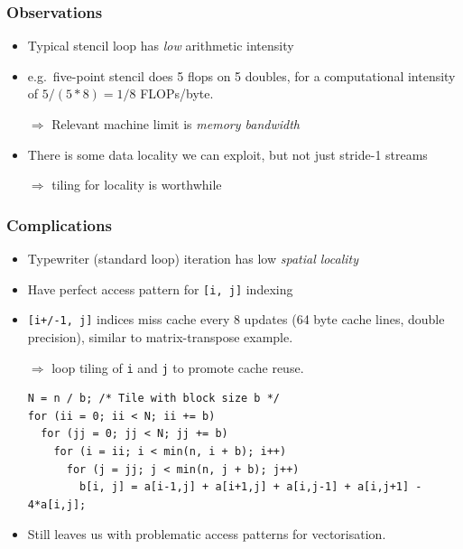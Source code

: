 \documentclass[presentation,aspectratio=43,10pt]{beamer}
\begin{document}
\begin{frame}
  \frametitle{Observations}
  \begin{itemize}
  \item Typical stencil loop has \emph{low} arithmetic intensity
  \item e.g.~five-point stencil does 5 flops on 5 doubles,
    for a computational intensity of $5 / (5*8) = 1/8$ FLOPs/byte.
  \item[$\Rightarrow$] Relevant machine limit is \emph{memory
      bandwidth}
  \item There is some data locality we can exploit, but not just
    stride-1 streams
  \item[$\Rightarrow$] tiling for locality is worthwhile
  \end{itemize}
\end{frame}

\begin{frame}[fragile]
  \frametitle{Complications}
  \begin{itemize}
  \item Typewriter (standard loop) iteration has low \emph{spatial
      locality}
  \item Have perfect access pattern for \texttt{[i, j]} indexing
  \item \texttt{[i+/-1, j]} indices miss cache every 8 updates (64
    byte cache lines, double precision), similar to matrix-transpose example.
  \item[$\Rightarrow$] loop tiling of \texttt{i} and \texttt{j} to
    promote cache reuse.
\begin{verbatim}
N = n / b; /* Tile with block size b */
for (ii = 0; ii < N; ii += b)
  for (jj = 0; jj < N; jj += b)
    for (i = ii; i < min(n, i + b); i++)
      for (j = jj; j < min(n, j + b); j++)
        b[i, j] = a[i-1,j] + a[i+1,j] + a[i,j-1] + a[i,j+1] - 4*a[i,j];
\end{verbatim}
  \item Still leaves us with problematic access patterns for
    vectorisation.
  \end{itemize}
\end{frame}
\end{document}
